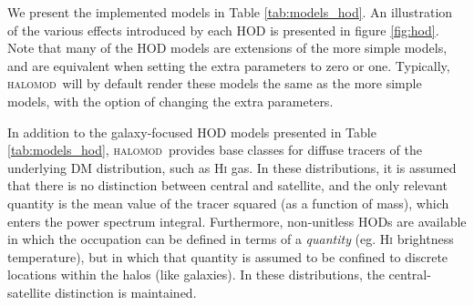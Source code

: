 \documentclass[5p,aas_macros]{elsarticle}
\newcommand{\halomod}{\textsc{halomod}}
\begin{document}
We present the implemented models in Table \ref{tab:models_hod}. An illustration of the various effects introduced by each HOD is presented in figure \ref{fig:hod}. Note that many of the HOD models are extensions of the more simple models, and are equivalent when setting the extra parameters to zero or one. Typically, \halomod\ will by default render these models the same as the more simple models, with the option of changing the extra parameters.

In addition to the galaxy-focused HOD models presented in Table \ref{tab:models_hod}, \halomod\ provides base classes for diffuse tracers of the underlying DM distribution, such as H\textsc{i} gas. 
In these distributions, it is assumed that there is no distinction between central and satellite, and the only relevant quantity is the mean value of the tracer squared (as a function of mass), which enters the power spectrum integral. 
Furthermore, non-unitless HODs are available in which the occupation can be defined in terms of a \textit{quantity} (eg. H\textsc{i} brightness temperature), but in which that quantity is assumed to be confined to discrete locations within the halos (like galaxies). In these distributions, the central-satellite distinction is maintained.


\end{document}
